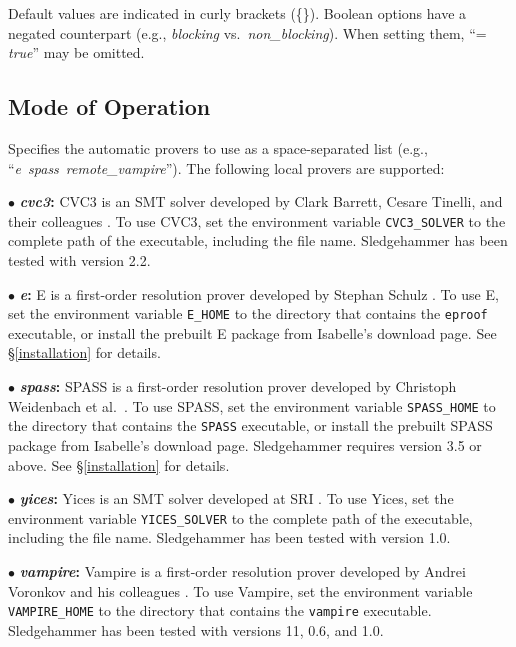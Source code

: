 \documentclass[a4paper,12pt]{article}
\begin{document}
Default values are indicated in curly brackets (\textrm{\{\}}). Boolean options
have a negated counterpart (e.g., \textit{blocking} vs.\
\textit{non\_blocking}). When setting them, ``= \textit{true}'' may be omitted.

\subsection{Mode of Operation}
\label{mode-of-operation}

\begin{enum}
Specifies the automatic provers to use as a space-separated list (e.g.,
``\textit{e}~\textit{spass}~\textit{remote\_vampire}''). The following local
provers are supported:

\begin{enum}
\item[$\bullet$] \textbf{\textit{cvc3}:} CVC3 is an SMT solver developed by
Clark Barrett, Cesare Tinelli, and their colleagues \cite{cvc3}. To use CVC3,
set the environment variable \texttt{CVC3\_SOLVER} to the complete path of the
executable, including the file name. Sledgehammer has been tested with version
2.2.

\item[$\bullet$] \textbf{\textit{e}:} E is a first-order resolution prover
developed by Stephan Schulz \cite{schulz-2002}. To use E, set the environment
variable \texttt{E\_HOME} to the directory that contains the \texttt{eproof}
executable, or install the prebuilt E package from Isabelle's download page. See
\S\ref{installation} for details.

\item[$\bullet$] \textbf{\textit{spass}:} SPASS is a first-order resolution
prover developed by Christoph Weidenbach et al.\ \cite{weidenbach-et-al-2009}.
To use SPASS, set the environment variable \texttt{SPASS\_HOME} to the directory
that contains the \texttt{SPASS} executable, or install the prebuilt SPASS
package from Isabelle's download page. Sledgehammer requires version 3.5 or
above. See \S\ref{installation} for details.

\item[$\bullet$] \textbf{\textit{yices}:} Yices is an SMT solver developed at
SRI \cite{yices}. To use Yices, set the environment variable
\texttt{YICES\_SOLVER} to the complete path of the executable, including the
file name. Sledgehammer has been tested with version 1.0.

\item[$\bullet$] \textbf{\textit{vampire}:} Vampire is a first-order resolution
prover developed by Andrei Voronkov and his colleagues
\cite{riazanov-voronkov-2002}. To use Vampire, set the environment variable
\texttt{VAMPIRE\_HOME} to the directory that contains the \texttt{vampire}
executable. Sledgehammer has been tested with versions 11, 0.6, and 1.0.


\end{enum}
\end{enum}
\end{document}
